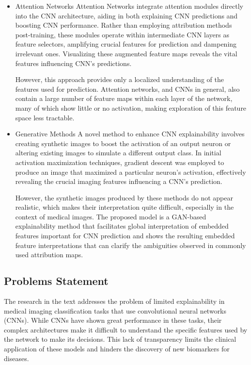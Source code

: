 \begin{itemize}
    \item Attention Networks
    Attention Networks integrate attention modules directly into the CNN architecture, aiding in both explaining CNN predictions and boosting CNN performance. Rather than employing attribution methods post-training, these modules operate within intermediate CNN layers as feature selectors, amplifying crucial features for prediction and dampening irrelevant ones. Visualizing these augmented feature maps reveals the vital features influencing CNN's predictions. 
    
    \noindent
    However, this approach provides only a localized understanding of the features used for prediction. Attention networks, and CNNs in general, also contain a large number of feature maps within each layer of the network, many of which show little or no activation, making exploration of this feature space less tractable.\cite{FIGAN}
    
    \item Generative Methods
    A novel method to enhance CNN explainability involves creating synthetic images to boost the activation of an output neuron or altering existing images to simulate a different output class. In initial activation maximization techniques, gradient descent was employed to produce an image that maximized a particular neuron's activation, effectively revealing the crucial imaging features influencing a CNN's prediction.
    
    \noindent
    However, the synthetic images produced by these methods do not appear realistic, which makes their interpretation quite difficult, especially in the context of medical images. The proposed model is a GAN-based explainability method that facilitates global interpretation of embedded features important for CNN prediction and shows the resulting embedded feature interpretations that can clarify the ambiguities observed in commonly used attribution maps\cite{FIGAN}.
\end{itemize}

\clearpage

\subsection{Problems Statement}

\noindent
The research in the text addresses the problem of limited explainability in medical imaging classification tasks that use convolutional neural networks (CNNs). While CNNs have shown great performance in these tasks, their complex architectures make it difficult to understand the specific features used by the network to make its decisions. This lack of transparency limits the clinical application of these models and hinders the discovery of new biomarkers for diseases.

